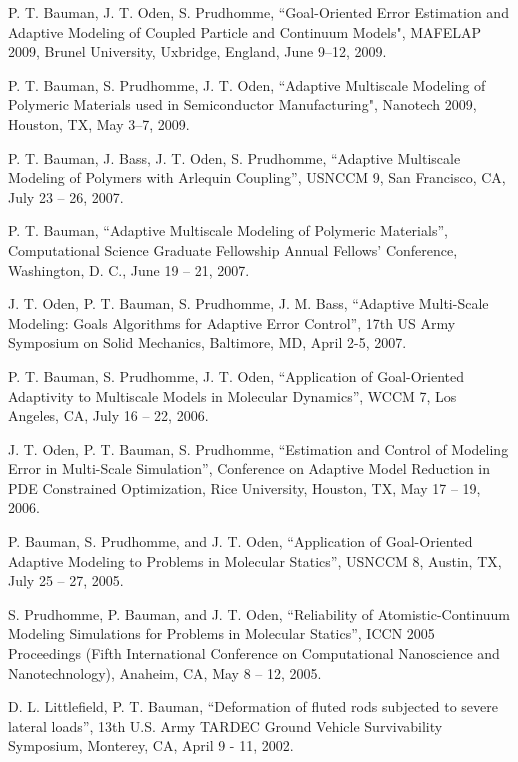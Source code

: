 \blankline

P. T. Bauman, J. T. Oden, S. Prudhomme,
``Goal-Oriented Error Estimation and Adaptive Modeling of Coupled Particle and Continuum Models", 
MAFELAP 2009, Brunel University, Uxbridge, England, June 9--12, 2009.

\blankline

P. T. Bauman, S. Prudhomme, J. T. Oden,
``Adaptive Multiscale Modeling of Polymeric Materials used in Semiconductor Manufacturing", 
Nanotech 2009, Houston, TX, May 3--7, 2009.

\blankline

P. T. Bauman, J. Bass, J. T. Oden, S. Prudhomme,
``Adaptive Multiscale Modeling of Polymers with Arlequin Coupling'',
USNCCM 9, San Francisco, CA, July 23 -- 26, 2007.

\blankline

P. T. Bauman,
``Adaptive Multiscale Modeling of Polymeric Materials'',
Computational Science Graduate Fellowship Annual Fellows' Conference, Washington, D. C., June 19 -- 21, 2007.

\blankline

J. T. Oden, P. T. Bauman, S. Prudhomme, J. M. Bass,
``Adaptive Multi-Scale Modeling: Goals Algorithms for Adaptive Error Control'',
17th US Army Symposium on Solid Mechanics, Baltimore, MD, April 2-5, 2007.

\blankline

P. T. Bauman, S. Prudhomme, J. T. Oden,
``Application of Goal-Oriented Adaptivity to Multiscale Models in Molecular Dynamics'',
WCCM 7, Los Angeles, CA, July 16 -- 22, 2006.

\blankline

J. T. Oden, P. T. Bauman, S. Prudhomme,
``Estimation and Control of Modeling Error in Multi-Scale Simulation'',
Conference on Adaptive Model Reduction in PDE Constrained Optimization,
Rice University, Houston, TX, May 17 -- 19, 2006.

\blankline

P. Bauman, S. Prudhomme, and J. T. Oden,
``Application of Goal-Oriented Adaptive Modeling to Problems in Molecular Statics'',
USNCCM 8, Austin, TX, July 25 -- 27, 2005.

\blankline 

S. Prudhomme, P. Bauman, and J. T. Oden,
``Reliability of Atomistic-Continuum Modeling Simulations for Problems in Molecular Statics'',
ICCN 2005 Proceedings (Fifth International Conference on Computational Nanoscience and Nanotechnology),
Anaheim, CA, May 8 -- 12, 2005.

\blankline

D. L. Littlefield, P. T. Bauman,
``Deformation of fluted rods subjected to severe lateral loads'',
13th U.S. Army TARDEC Ground Vehicle Survivability Symposium, Monterey, CA, April 9 - 11, 2002.
